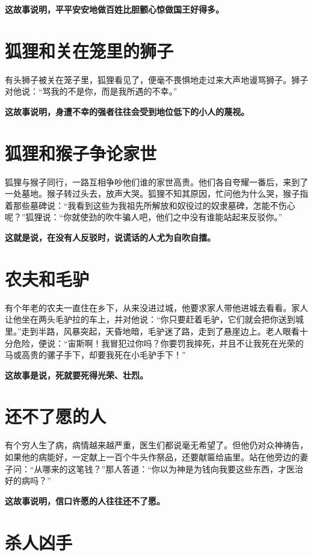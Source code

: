 {\bfseries \color{red}这故事说明，平平安安地做百姓比胆颤心惊做国王好得多。}

\section{狐狸和关在笼里的狮子}

有头狮子被关在笼子里，狐狸看见了，便毫不畏惧地走过来大声地谩骂狮子。狮子对他说：“骂我的不是你，而是我所遇的不幸。”

{\bfseries \color{red}这故事说明，身遭不幸的强者往往会受到地位低下的小人的蔑视。}

\section{狐狸和猴子争论家世}

狐狸与猴子同行，一路互相争吵他们谁的家世高贵。他们各自夸耀一番后，来到了一处墓地。猴子转过头去，放声大哭。狐狸不知其原因，忙问他为什么哭，猴子指着那些墓碑说：“我看到这些为我祖先所解放和奴役过的奴隶墓碑，怎能不伤心呢？”狐狸说：“你就使劲的吹牛骗人吧，他们之中没有谁能站起来反驳你。”

{\bfseries \color{red}这就是说，在没有人反驳时，说谎话的人尤为自吹自擂。}

\section{农夫和毛驴}

有个年老的农夫一直住在乡下，从来没进过城，他要求家人带他进城去看看。家人让他坐在两头毛驴拉的车上，并对他说：“你只要赶着毛驴，它们就会把你送到城里。”走到半路，风暴突起，天昏地暗，毛驴迷了路，走到了悬崖边上。老人眼看十分危险，便说：“宙斯啊！我冒犯过你吗？你要罚我摔死，并且不让我死在光荣的马或高贵的骡子手下，却要我死在小毛驴手下！”

{\bfseries \color{red}这故事是说，死就要死得光荣、壮烈。}

\section{还不了愿的人}

有个穷人生了病，病情越来越严重，医生们都说毫无希望了。但他仍对众神祷告，如果他的病能好，一定献上一百个牛头作祭品，还要献匾给庙里。站在他旁边的妻子问：“从哪来的这笔钱？”那人答道：“你以为神是为钱向我要这些东西，才医治好的病吗？”

{\bfseries \color{red}这故事说明，信口许愿的人往往还不了愿。}

\section{杀人凶手}

